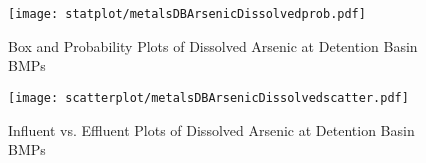         \begin{figure}[hb]   %
            \centering
            \texttt{[image: statplot/metalsDBArsenicDissolvedprob.pdf]}
            \caption{Box and Probability Plots of Dissolved Arsenic at Detention Basin BMPs}
        \end{figure}         %
        
        
        \begin{figure}[hb]   %
            \centering
            \texttt{[image: scatterplot/metalsDBArsenicDissolvedscatter.pdf]}
            \caption{Influent vs. Effluent Plots of Dissolved Arsenic at Detention Basin BMPs}
        \end{figure}         %
        \clearpage
        